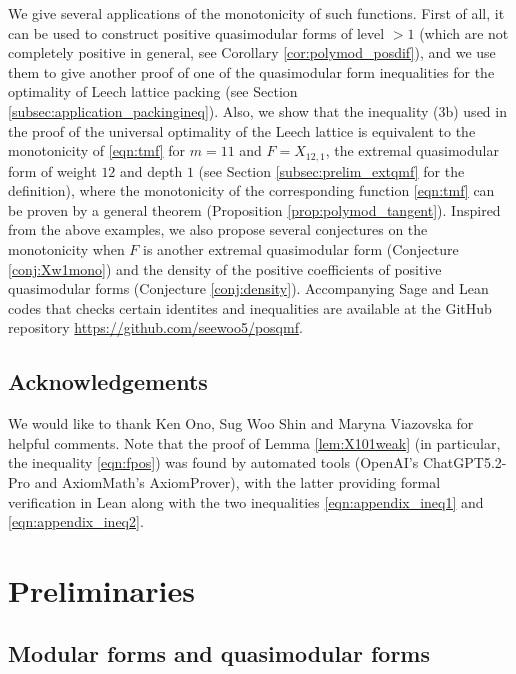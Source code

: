\documentclass[10pt,reqno]{amsproc}
\newcommand{\1}{\mathds{1}}	%
\theoremstyle{definition}
\theoremstyle{remark}
\begin{document}
We give several applications of the monotonicity of such functions.
First of all, it can be used to construct positive quasimodular forms of level $> 1$ (which are not completely positive in general, see Corollary \ref{cor:polymod_posdif}), and we use them to give another proof of one of the quasimodular form inequalities for the optimality of Leech lattice packing \cite{cohn2017sphere} (see Section \ref{subsec:application_packingineq}).
Also, we show that the inequality (3b) used in the proof of the universal optimality of the Leech lattice \cite{cohn2022universal} is equivalent to the monotonicity of \eqref{eqn:tmf} for $m = 11$ and $F = X_{12, 1}$, the extremal quasimodular form of weight $12$ and depth $1$ (see Section \ref{subsec:prelim_extqmf} for the definition), where the monotonicity of the corresponding function \eqref{eqn:tmf} can be proven by a general theorem (Proposition \ref{prop:polymod_tangent}).
Inspired from the above examples, we also propose several conjectures on the monotonicity when $F$ is another extremal quasimodular form (Conjecture \ref{conj:Xw1mono}) and the density of the positive coefficients of positive quasimodular forms (Conjecture \ref{conj:density}).
Accompanying Sage and Lean codes that checks certain identites and inequalities are available at the GitHub repository \url{https://github.com/seewoo5/posqmf}.


\subsection*{Acknowledgements}

We would like to thank Ken Ono, Sug Woo Shin and Maryna Viazovska for helpful comments.
Note that the proof of Lemma \ref{lem:X101weak} (in particular, the inequality \eqref{eqn:fpos}) was found by automated tools (OpenAI's ChatGPT5.2-Pro and AxiomMath's AxiomProver), with the latter providing formal verification in Lean along with the two inequalities \eqref{eqn:appendix_ineq1} and \eqref{eqn:appendix_ineq2}.

\section{Preliminaries}\label{sec:preliminaries}

\subsection{Modular forms and quasimodular forms}
\label{subsec:prelim_qmf}
\end{document}

